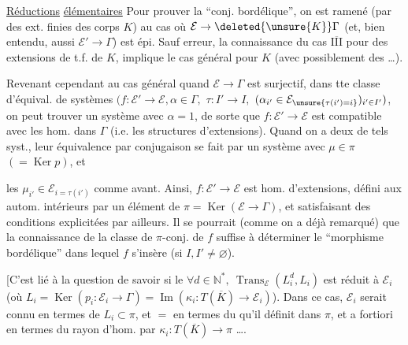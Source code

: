 \uline{Réductions} \uline{élémentaires} Pour prouver la ``conj. bordélique'', on est ramené (par des ext. finies des corps $K$) au cas où $\mathcal E\to\deleted{\unsure{K}}\Gamma$ (et, bien entendu, aussi $\mathcal E'\to\Gamma$) est épi. Sauf erreur, la connaissance du cas \uline{$\overline{\mathrm{III}}$} pour des extensions de t.f. de $K$, implique le cas général pour $K$ (avec possiblement des  \ldots).

Revenant cependant au cas général quand $\mathcal E\to\Gamma$ est surjectif, dans tte classe d'équival. de systèmes $(f:\mathcal E'\to\mathcal E,\alpha\in\Gamma,$  $\tau:I'\to I,$  $(\alpha_{i'}\in\mathcal E_{\unsure{\tau(i')=i}})_{i'\in I'})$, on peut trouver un système avec $\alpha=1$, de sorte que $f:\mathcal E'\to\mathcal E$ est compatible avec les hom. dans $\Gamma$ (i.e. les structures d'extensions).
Quand on a deux de tels syst., leur équivalence par conjugaison se fait par un système  avec \uline{$\mu\in\pi$} $(=\operatorname{Ker}p)$, et



les $\mu_{i'}\in\mathcal E_{i=\tau(i')}$ comme avant. Ainsi, $f:\mathcal E'\to\mathcal E$ est   hom. d'extensions, défini aux autom. intérieurs par un élément de $\pi=\operatorname{Ker}(\mathcal E\to\Gamma)$, et satisfaisant des conditions explicitées par ailleurs.
Il se pourrait (comme on a déjà remarqué) que la connaissance de la classe de $\pi$-conj. de $f$ suffise à déterminer le ``morphisme bordélique'' dans lequel $f$ s'insère (si $I,I'\ne\varnothing$).

[C'est lié à la question de savoir si le  $\forall d\in\mathbb N^*,\ \operatorname{Trans}_{\mathcal E}(L_i^d,L_i)$ est réduit à $\mathcal E_i$ (où $L_i=\operatorname{Ker}(p_i:\mathcal E_i\to\Gamma)=\operatorname{Im}(\kappa_i:T(\overline K)\to\mathcal E_i)$).
Dans ce cas, $\mathcal E_i$ serait connu en termes de $L_i\subset\pi$, et $=$ en termes du  qu'il définit dans $\pi$, et a fortiori en termes du rayon d'hom.  par $\kappa_i:T(\overline K)\to\pi$ \ldots.



